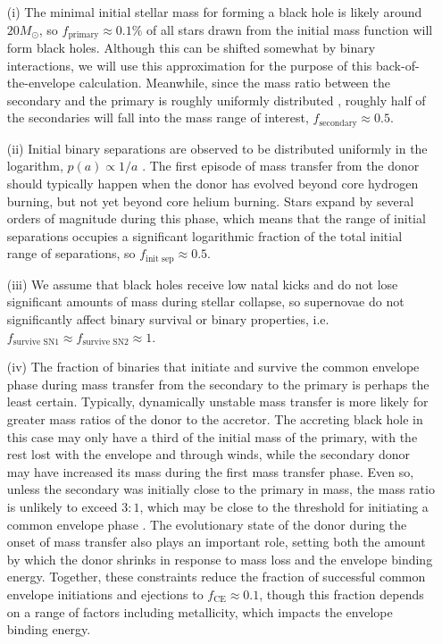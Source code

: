 \documentclass[review]{elsarticle}
\begin{document}
\begin{enumerate}
	\item[(i)] The minimal initial stellar mass for forming a black hole is likely around $20 M_\odot$, so $f_\textrm{primary} \approx 0.1\%$ of all stars drawn from the \citet{Kroupa:2002} initial mass function will form black holes. Although this can be shifted somewhat by binary interactions, we will use this approximation for the purpose of this back-of-the-envelope calculation. Meanwhile, since the mass ratio between the secondary and the primary is roughly uniformly distributed \citep{Sana:2012,MoeDiStefano:2017}, roughly half of the secondaries will fall into the mass range of interest, $f_\textrm{secondary} \approx 0.5$.  

\item[(ii)] Initial binary  separations are observed to be distributed uniformly in the logarithm, $p(a) \propto 1/a$ \citep{Opik:1924}.  The first episode of mass transfer from the donor should typically happen when the donor has evolved beyond core hydrogen burning, but not yet beyond core helium burning.  Stars expand by several orders of magnitude during this phase, which means that the range of initial separations occupies a significant logarithmic fraction of the total initial range of separations, so $f_\textrm{init sep} \approx 0.5$.  

\item[(iii)]  We assume that black holes receive low natal kicks and do not lose significant amounts of mass during stellar collapse, so supernovae do not significantly affect binary survival or binary properties, i.e. $f_\textrm{survive SN1} \approx f_\textrm{survive SN2} \approx 1$.  

\item[(iv)] The fraction of binaries that initiate and survive the common envelope phase during mass transfer from the secondary to the primary is perhaps the least certain.  Typically, dynamically unstable mass transfer is more likely for greater mass ratios of the donor to the accretor.  The accreting black hole in this case may only have a third of the initial mass of the primary, with the rest lost with the envelope and through winds, while the secondary donor may have increased its mass during the first mass transfer phase.  Even so, unless the secondary was initially close to the primary in mass, the mass ratio is unlikely to exceed $3:1$, which may be close to the threshold for initiating a common envelope phase \citep[e.g.,][]{Claeys:2014}.  The evolutionary state of the donor during the onset of mass transfer also plays an important role, setting both the amount by which the donor shrinks in response to mass loss and the envelope binding energy.  Together, these constraints reduce the fraction of successful common envelope initiations and ejections to $f_\textrm{CE} \approx 0.1$, though this fraction depends on a range of factors including metallicity, which impacts the envelope binding energy.   


\end{enumerate}
\end{document}
